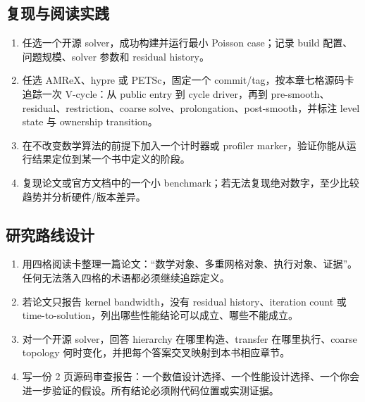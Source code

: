 \subsection*{复现与阅读实践}
\begin{enumerate}[label=\arabic*.]
\item 任选一个开源 solver，成功构建并运行最小 Poisson case；记录 build 配置、问题规模、solver 参数和 residual history。
\item 任选 AMReX、hypre 或 PETSc，固定一个 commit/tag，按本章七格源码卡追踪一次 V-cycle：从 public entry 到 cycle driver，再到 pre-smooth、residual、restriction、coarse solve、prolongation、post-smooth，并标注 level state 与 ownership transition。
\item 在不改变数学算法的前提下加入一个计时器或 profiler marker，验证你能从运行结果定位到某一个书中定义的阶段。
\item 复现论文或官方文档中的一个小 benchmark；若无法复现绝对数字，至少比较趋势并分析硬件/版本差异。
\end{enumerate}

\subsection*{研究路线设计}
\begin{enumerate}[label=\arabic*.]
\item 用四格阅读卡整理一篇论文：“数学对象、多重网格对象、执行对象、证据”。任何无法落入四格的术语都必须继续追踪定义。
\item 若论文只报告 kernel bandwidth，没有 residual history、iteration count 或 time-to-solution，列出哪些性能结论可以成立、哪些不能成立。
\item 对一个开源 solver，回答 hierarchy 在哪里构造、transfer 在哪里执行、coarse topology 何时变化，并把每个答案交叉映射到本书相应章节。
\item 写一份 2 页源码审查报告：一个数值设计选择、一个性能设计选择、一个你会进一步验证的假设。所有结论必须附代码位置或实测证据。
\end{enumerate}
